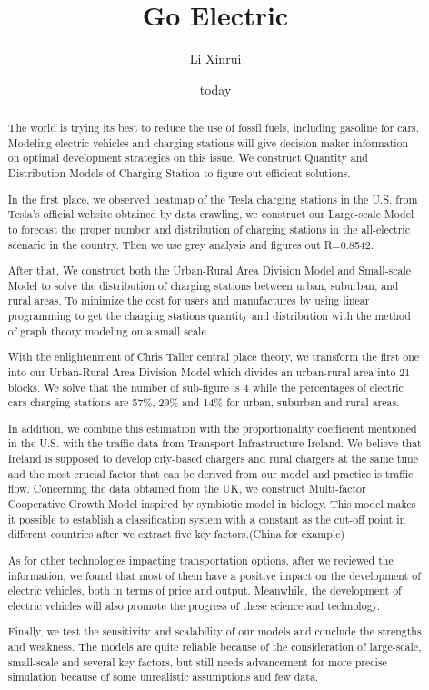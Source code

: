 \documentclass{mcmthesis}
\title{Go Electric}
\author{Li Xinrui}
\date{today}
\begin{document}
\begin{abstract}
The world is trying its best to reduce the use of fossil fuels, including gasoline for cars. Modeling electric vehicles and charging stations will give decision maker information on optimal development strategies on this issue. We construct Quantity and Distribution Models of Charging Station to figure out efficient solutions.

In the first place, we observed heatmap of the Tesla charging stations in the U.S. from Tesla's official website obtained by data crawling, we construct our Large-scale Model to forecast the proper number and distribution of charging stations in the all-electric scenario in the country. Then we use grey analysis and figures out R=0.8542. 

After that, We construct both the Urban-Rural Area Division Model and Small-scale Model to solve the distribution of charging stations between urban, suburban, and rural areas. To minimize the cost for users and manufactures by using linear programming to get the charging stations quantity and distribution with the method of graph theory modeling on a small scale.

With the enlightenment of Chris Taller central place theory, we transform the first one into our Urban-Rural Area Division Model which divides an urban-rural area into 21 blocks. We solve that the number of sub-figure is 4 while the percentages of electric cars charging stations are 57\%, 29\% and 14\% for urban, suburban and rural areas.

In addition, we combine this estimation with the proportionality coefficient mentioned in the U.S. with the traffic data from Transport Infrastructure Ireland. We believe that Ireland is supposed to develop city-based chargers and rural chargers at the same time and the most crucial factor that can be derived from our model and practice is traffic flow.
Concerning the data obtained from the UK, we construct Multi-factor Cooperative Growth Model inspired by symbiotic model in biology. This model makes it possible to establish a classification system with a constant as the cut-off point in different countries after we extract five key factors.(China for example) 

As for other technologies impacting transportation options, after we reviewed the information, we found that most of them have a positive impact on the development of electric vehicles, both in terms of price and output. Meanwhile, the development of electric vehicles will also promote the progress of these science and technology. 

Finally, we test the sensitivity and scalability of our models and conclude the strengths and weakness. The models are quite reliable because of the consideration of large-scale, small-scale and several key factors, but still needs advancement for more precise simulation because of some unrealistic assumptions and few data. 


\end{abstract}
\end{document}
